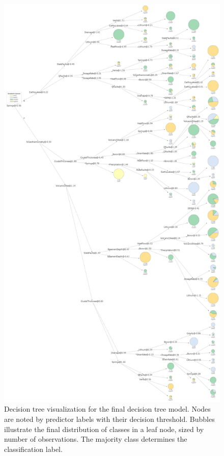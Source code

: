 \begin{figure}[!htp]
\centering
\includegraphics[height=0.85\textheight,keepaspectratio]{templates/images/Figure-DT_viz_portrait.pdf}
\caption[Decision tree visualization]{Decision tree visualization for the final decision tree model. Nodes are noted by predictor labels with their decision threshold. Bubbles illustrate the final distribution of classes in a leaf node, sized by number of observations. The majority class determines the classification label.}
\label{fig:dtree_viz}
\end{figure}

